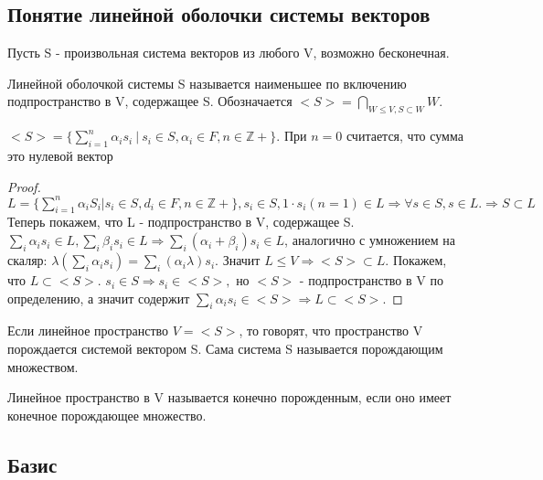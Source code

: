 \subsection{Понятие линейной оболочки системы векторов}
Пусть S - произвольная система векторов из любого V, возможно бесконечная.
\begin{definition}
	Линейной оболочкой системы S называется наименьшее по включению подпространство в V, содержащее S. Обозначается \(<S> = \bigcap_{W\le V, S\subset W} W\).
\end{definition}
\begin{proposition}
	\(<S> = \{\sum_{i=1}^{n}\alpha_is_i \: |\: s_i\in S, \alpha_i\in F, n\in \mathbb{Z+}\}\). При \(n=0\) считается, что сумма это нулевой вектор
\end{proposition}
\begin{proof}
	\(L = \{\sum_{i=1}^{n}\alpha_iS_i|s_i\in S, d_i\in F, n\in \mathbb{Z+}\}, s_i\in S, 1\cdot s_i(n = 1)\in L\Longrightarrow \forall s\in S, s\in L. \Longrightarrow S \subset L\)\\
	Теперь покажем, что L - подпространство в V, содержащее S. \(\sum_{i}\alpha_is_i\in L, \sum_{i} \beta_is_i\in L\Longrightarrow \sum_i(\alpha_i+\beta_i)s_i\in L\), аналогично с умножением на скаляр:
	 \(\lambda(\sum_i \alpha_is_i) = \sum_i(\alpha_i\lambda)s_i\). Значит \(L\le V\Longrightarrow <S> \subset L\). \newline
	Покажем, что \(L\subset <S>\). \(s_i\in S\Longrightarrow s_i\in <S>,\) но \(<S>\) - подпространство в V по определению, а значит содержит \(\sum_i\alpha_is_i\in<S>\Longrightarrow L\subset<S>\).
\end{proof}
\begin{definition}
	Если линейное пространство \(V = <S>\), то говорят, что пространство V порождается системой вектором S. Сама система S называется порождающим множеством.
\end{definition}
\begin{definition}
	Линейное пространство в V называется конечно порожденным, если оно имеет конечное порождающее множество.
\end{definition}

\subsection{Базис}

